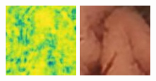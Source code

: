 \documentclass[conference]{IEEEtran}
\begin{document}
\begin{figure}[!t]
        \vfill
        \includegraphics[width=\linewidth]{Figures/906/906_RCAN_ssim.jpg}
        
    \endminipage\hfill
        \centering
        \includegraphics[width=\linewidth]{Figures/906/906_proposed.jpg}
        

\end{figure}
\end{document}
